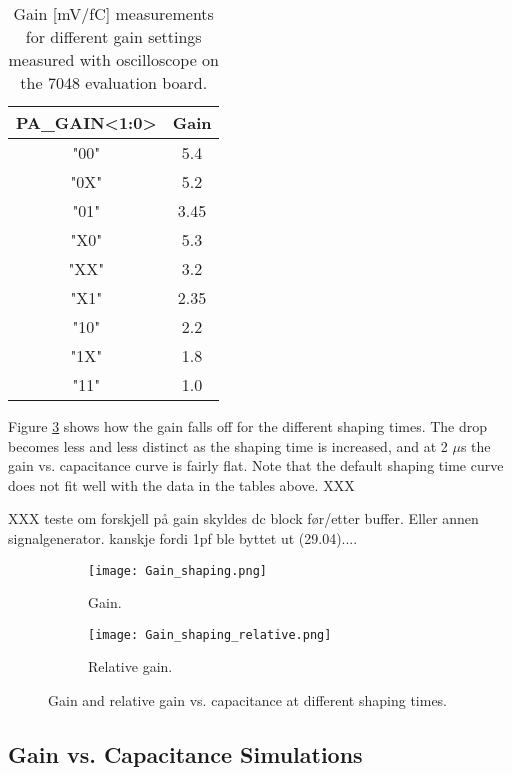 \documentclass[../main/thesis.tex]{subfiles}
\begin{document}
\begin{table}[h!]
	\begin{center}
		\caption{Gain [mV/fC] measurements for different gain settings measured with oscilloscope on the 7048 evaluation board.}
		\label{tab-gains-7048}
		\begin{tabular}{cc}\toprule
			\textbf{PA\_GAIN<1:0>} & \textbf{Gain}   \\ \midrule
			"00" & 5.4  \\
			"0X" & 5.2  \\
			"01" & 3.45 \\
			"X0" & 5.3  \\
			"XX" & 3.2  \\
			"X1" & 2.35 \\
			"10" & 2.2  \\
			"1X" & 1.8  \\
			"11" & 1.0   \\ \bottomrule
		\end{tabular}
	\end{center}
\end{table}

Figure \ref{fig-IDE1180-gain} shows how the gain falls off for the different shaping times. The drop becomes less and less distinct as the shaping time is increased, and at 2 $\mu$s the gain vs. capacitance curve is fairly flat. Note that the default shaping time curve does not fit well with the data in the tables above. XXX

XXX teste om forskjell på gain skyldes dc block før/etter buffer. Eller annen signalgenerator. kanskje fordi 1pf ble byttet ut (29.04)....

\begin{figure}
	\centering
	\begin{subfigure}{.5\textwidth}
		\centering
		\texttt{[image: Gain\_shaping.png]}
		\caption{Gain.}
		\label{fig-IDE1180-gain-}
	\end{subfigure}%
	\begin{subfigure}{.5\textwidth}
		\centering
		\texttt{[image: Gain\_shaping\_relative.png]}
		\caption{Relative gain.}
		\label{fig-IDE1180-gain-rel} %
	\end{subfigure}
	\caption{Gain and relative gain vs. capacitance at different shaping times.}
	\label{fig-IDE1180-gain}
\end{figure}

\subsection{Gain vs. Capacitance Simulations}
\end{document}
